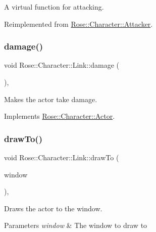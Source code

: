 A virtual function for attacking. 



Reimplemented from \mbox{\hyperlink{classRose_1_1Character_1_1Attacker_a49ee8dfa04018f90c7fd5fa20ba4fcad}{Rose\+::\+Character\+::\+Attacker}}.

\mbox{\label{classRose_1_1Character_1_1Link_a7918cd89bf9da3eced41055567c7c27c}} 
\subsubsection{\texorpdfstring{damage()}{damage()}}
{\footnotesize\ttfamily void Rose\+::\+Character\+::\+Link\+::damage (\begin{DoxyParamCaption}{ }\end{DoxyParamCaption})\hspace{0.3cm}{\ttfamily [override]}, {\ttfamily [virtual]}}



Makes the actor take damage. 



Implements \mbox{\hyperlink{classRose_1_1Character_1_1Actor_a8d835beb192c864967c7a9b3a5f7f579}{Rose\+::\+Character\+::\+Actor}}.

\mbox{\label{classRose_1_1Character_1_1Link_a7992daadbfc55011376b94604909668c}} 
\subsubsection{\texorpdfstring{drawTo()}{drawTo()}}
{\footnotesize\ttfamily void Rose\+::\+Character\+::\+Link\+::draw\+To (\begin{DoxyParamCaption}\item[{sf\+::\+Render\+Window \&}]{window }\end{DoxyParamCaption})\hspace{0.3cm}{\ttfamily [override]}, {\ttfamily [virtual]}}



Draws the actor to the window. 


\begin{DoxyParams}{Parameters}
{\em window} & The window to draw to \\
\hline
\end{DoxyParams}


